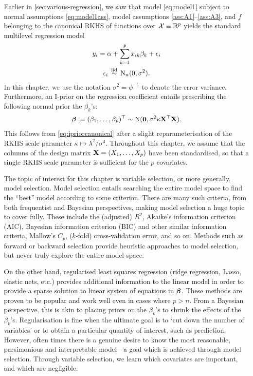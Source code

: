 \documentclass[a4paper,showframe,11pt]{report}
\begin{document}

Earlier in \cref{sec:various-regression}, we saw that model \cref{eq:model1} subject to normal assumptions \cref{eq:model1ass}, model assumptions \ref{ass:A1}--\ref{ass:A3}, and $f$ belonging to the canonical RKHS of functions over ${\mathcal X} \equiv \mathbb{R}^p$ yields the standard multilevel regression model
\begin{align}\label{eq:linmod}
  \begin{gathered}
    y_i = \alpha + \sum_{k=1}^p x_{ik}\beta_k + \epsilon_i \\
    \epsilon_i \,\overset{\text{iid}}{\sim}\, \operatorname{N}_n(0, \sigma^2).
  \end{gathered}  
\end{align}
In this chapter, we use the notation $\sigma^2 = \psi^{-1}$ to denote the error variance.
Furthermore, an I-prior on the regression coefficient entails prescribing the following normal prior the $\beta_k$'s:
\[
  {\bm\beta} := (\beta_1,\dots,\beta_p)^\top \sim \operatorname{N} ({\mathbf 0}, \sigma^2 \kappa \mathbf X^\top \mathbf X).
\]
This follows from \cref{eq:ipriorcanonical} after a slight reparameterisation of the RKHS scale parameter $\kappa \mapsto \lambda^2/\sigma^4$. 
Throughout this chapter, we assume that the columns of the design matrix ${\mathbf X} = (X_1,\dots,X_p)$ have been standardised, so that a single RKHS scale parameter is sufficient for the $p$ covariates.

The topic of interest for this chapter is variable selection, or more generally, model selection.
Model selection entails searching the entire model space to find the ``best'' model according to some criterion. 
There are many such criteria, from both frequentist and Bayesian perspectives, making model selection a huge topic to cover fully. 
These include the (adjusted) $R^2$, Akaike's information criterion (AIC), Bayesian information criterion (BIC) and other similar information criteria, Mallow's $C_p$, ($k$-fold) cross-validation error, and so on. 
Methods such as forward or backward selection provide heuristic approaches to model selection, but never truly explore the entire model space.

On the other hand, regularised least squares regression (ridge regression, Lasso, elastic nets, etc.) provides additional information to the linear model in order to provide a sparse solution to linear system of equations in ${\bm\beta}$.
These methods are proven to be popular and work well even in cases where $p > n$.
From a Bayesian perspective, this is akin to placing priors on the $\beta_k$'s to shrink the effects of the $\beta_k$'s.
Regularisation is fine when the ultimate goal is to `cut down the number of variables' or to obtain a particular quantity of interest, such as prediction.
However, often times there is a genuine desire to know the most reasonable, parsimonious and interpretable model---a goal which is achieved through model selection.
Through variable selection, we learn which covariates are important, and which are negligible.
\end{document}
